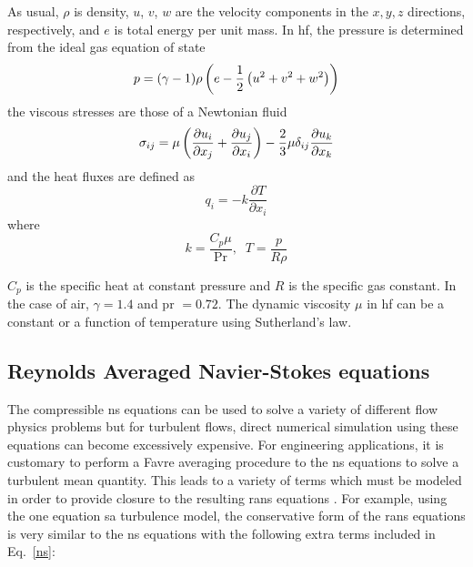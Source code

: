 As usual, $\rho$ is density, $u$, $v$, $w$ are the velocity components in the $x, y, z$ directions, respectively, and $e$ is total energy per unit mass. In \gls{hf}, the pressure is determined from the ideal gas equation of state
\begin{equation}
p = (\gamma - 1)\rho\left(e - \frac{1}{2}\left(u^2 + v^2 + w^2\right)\right)
\end{equation}
the viscous stresses are those of a Newtonian fluid
\begin{equation}\label{sigma}
\sigma_{ij} = \mu\left( \frac{\partial u_i}{\partial x_j}
+ \frac{\partial u_j}{\partial x_i} \right)
- \frac{2}{3}\mu \delta_{ij}\frac{\partial u_k}{\partial x_k}
\end{equation}
and the heat fluxes are defined as
\begin{equation}
q_i = -k \frac{\partial T}{\partial x_i}
\end{equation}
where
\begin{equation}
k = \frac{C_p \mu}{\text{Pr}} , \;\; T = \frac{p}{R \rho}
\end{equation}

$C_p$ is the specific heat at constant pressure and $R$ is the specific gas constant. In the case of air, $\gamma = 1.4$ and \gls{pr} $= 0.72$. The dynamic viscosity $\mu$ in \gls{hf} can be a constant or a function of temperature using Sutherland's law.

\subsection{Reynolds Averaged Navier-Stokes equations}

The compressible \gls{ns} equations can be used to solve a variety of different flow physics problems but for turbulent flows, direct numerical simulation using these equations can become excessively expensive. For engineering applications, it is customary to perform a Favre averaging procedure to the \gls{ns} equations to solve a turbulent mean quantity. 
This leads to a variety of terms which must be modeled in order to provide closure to the resulting \gls{rans} equations \cite{wilcox1998turbulence,oliver2008high}. For example, using the one equation \gls{sa} turbulence model, the conservative form of the \gls{rans} equations is very similar to the \gls{ns} equations with the following extra terms included in Eq.~\ref{ns}:

